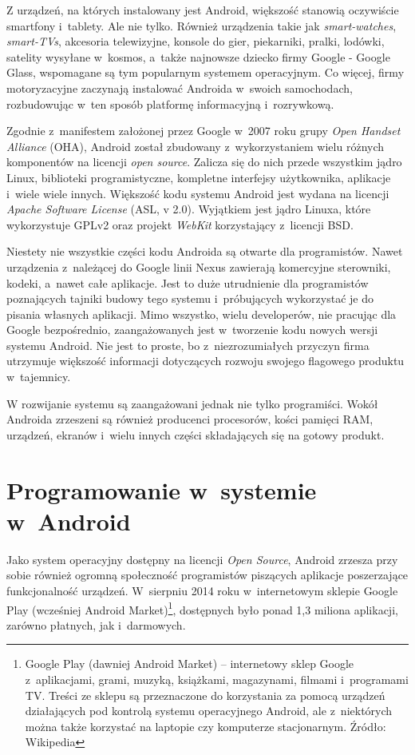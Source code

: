 Z urządzeń, na których instalowany jest Android, większość stanowią oczywiście smartfony i~tablety. Ale nie tylko. Również urządzenia takie jak \textit{smart-watches}, \textit{smart-TVs}, akcesoria telewizyjne, konsole do gier, piekarniki, pralki, lodówki, satelity wysyłane w~kosmos, a~także najnowsze dziecko firmy Google - Google Glass, wspomagane są tym popularnym systemem operacyjnym. Co więcej, firmy motoryzacyjne zaczynają instalować Androida w~swoich samochodach, rozbudowując w~ten sposób platformę informacyjną i~rozrywkową.

Zgodnie z~manifestem założonej przez Google w~2007 roku grupy \textit{Open Handset Alliance} (OHA), Android został zbudowany z~wykorzystaniem wielu różnych komponentów na licencji \textit{open source}. Zalicza się do nich przede wszystkim jądro Linux, biblioteki programistyczne, kompletne interfejsy użytkownika, aplikacje i~wiele wiele innych. Większość kodu systemu Android jest wydana na licencji \textit{Apache Software License} (ASL, v 2.0). Wyjątkiem jest jądro Linuxa, które wykorzystuje GPLv2 oraz projekt \textit{WebKit} korzystający z~licencji BSD. 

Niestety nie wszystkie części kodu Androida są otwarte dla programistów. Nawet urządzenia z~należącej do Google linii Nexus zawierają komercyjne sterowniki, kodeki, a~nawet całe aplikacje. Jest to duże utrudnienie dla programistów poznających tajniki budowy tego systemu i~próbujących wykorzystać je do pisania własnych aplikacji. Mimo wszystko, wielu developerów, nie pracując dla Google bezpośrednio, zaangażowanych jest w~tworzenie kodu nowych wersji systemu Android. Nie jest to proste, bo z~niezrozumiałych przyczyn firma utrzymuje większość informacji dotyczących rozwoju swojego flagowego produktu w~tajemnicy.

W rozwijanie systemu są zaangażowani jednak nie tylko programiści. Wokół Androida zrzeszeni są również producenci procesorów, kości pamięci RAM, urządzeń, ekranów i~wielu innych części składających się na gotowy produkt.

\section{Programowanie w~systemie w~Android}
Jako system operacyjny dostępny na licencji \textit{Open Source}, Android zrzesza przy sobie również ogromną społeczność programistów piszących aplikacje poszerzające funkcjonalność urządzeń. W~sierpniu 2014 roku w~internetowym sklepie Google Play (wcześniej Android Market)\footnote{Google Play (dawniej Android Market) – internetowy sklep Google z~aplikacjami, grami, muzyką, książkami, magazynami, filmami i~programami TV. Treści ze sklepu są przeznaczone do korzystania za pomocą urządzeń działających pod kontrolą systemu operacyjnego Android, ale z~niektórych można także korzystać na laptopie czy komputerze stacjonarnym. Źródło: Wikipedia}, dostępnych było ponad 1,3 miliona aplikacji, zarówno płatnych, jak i~darmowych.

